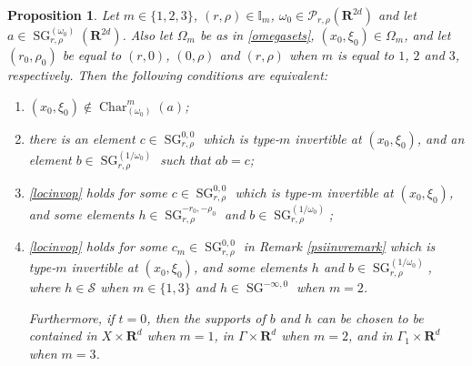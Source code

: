 \documentclass[12pt,a4paper,reqno]{amsart}
\numberwithin{equation}{section}
\numberwithin{thm}{section}
\newtheorem{prop}[thm]{Proposition}
\theoremstyle{definition}
\theoremstyle{remark}
\begin{document}
\begin{prop}\label{charequiv}
Let $m\in \{1,2,3\}$, $(r,\rho )\in \mathbb I_m$, $\omega _0\in
\mathscr P_{r,\rho}({\mathbf R^{{2d}}})$ and let $a\in {\operatorname{SG}} ^{(\omega _0)}_{r,\rho }({\mathbf R^{{2d}}})$. Also let $\Omega _m$ be as in \eqref{omegasets}, $(x_0,\xi _0)\in
\Omega _m$, and let $(r_0,\rho _0)$ be equal to $(r,0)$, $ (0,\rho ) $
and $(r,\rho )$ when $m$ is equal to $1$, $2$ and $3$, respectively.
Then the following conditions are equivalent:

\medspace

\begin{enumerate}

\item $(x_0,\xi _0)\notin {\operatorname{Char}} _{(\omega _0)}^m (a)$;

{\vspace{0.1cm}}

\item there is an element $c\in {\operatorname{SG}}^{0,0}_{r,\rho}$ which is
type-$m$ invertible at $(x_0,\xi _0)$, and an element $b\in
{\operatorname{SG}}^{(1/\omega _0)}_{r,\rho}$ such that $ab=c$;

{\vspace{0.1cm}}

\item \eqref{locinvop} holds for some $c\in {\operatorname{SG}}^{0,0}_{r,\rho}$ which is
type-$m$ invertible at $(x_0,\xi _0)$, and some elements  $h\in
{\operatorname{SG}}^{-r_0,-\rho _0}_{r,\rho}$ and $b\in {\operatorname{SG}}^{(1/\omega _0)}_{r,\rho}$;

{\vspace{0.1cm}}

\item \eqref{locinvop} holds for some $c_m\in {\operatorname{SG}}^{0,0}_{r,\rho}$
in Remark \ref{psiinvremark} which is
type-$m$ invertible at $(x_0,\xi _0)$, and some elements  $h$ and $b\in
{\operatorname{SG}}^{(1/\omega _0)}_{r,\rho}$, where $h\in \mathscr S$ when $m\in
\{ 1,3\}$ and $h\in {\operatorname{SG}} ^{-\infty ,0}$ when $m=2$.

\par

Furthermore, if $t=0$, then the supports of $b$ and $h$ can be chosen to be
contained in $X\times {\mathbf R^{d}}$ when $m=1$, in $\Gamma \times {\mathbf R^{d}}$ when
$m=2$, and in $\Gamma _1\times {\mathbf R^{d}}$ when $m=3$.
\end{enumerate}
\end{prop}
\end{document}
